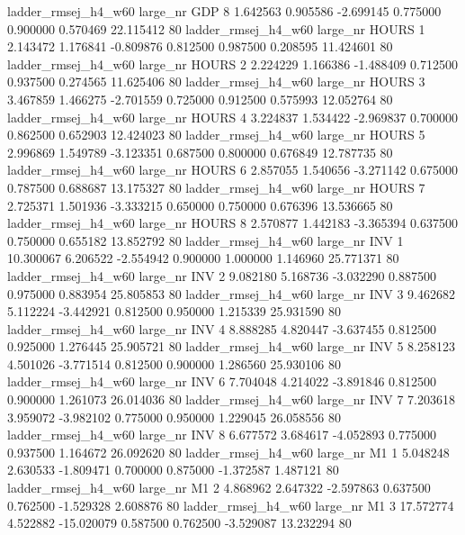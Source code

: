 ladder_rmsej_h4_w60   large_nr      GDP                 8  1.642563  0.905586  -2.699145 0.775000 0.900000  0.570469   22.115412 80
ladder_rmsej_h4_w60   large_nr    HOURS                 1  2.143472  1.176841  -0.809876 0.812500 0.987500  0.208595   11.424601 80
ladder_rmsej_h4_w60   large_nr    HOURS                 2  2.224229  1.166386  -1.488409 0.712500 0.937500  0.274565   11.625406 80
ladder_rmsej_h4_w60   large_nr    HOURS                 3  3.467859  1.466275  -2.701559 0.725000 0.912500  0.575993   12.052764 80
ladder_rmsej_h4_w60   large_nr    HOURS                 4  3.224837  1.534422  -2.969837 0.700000 0.862500  0.652903   12.424023 80
ladder_rmsej_h4_w60   large_nr    HOURS                 5  2.996869  1.549789  -3.123351 0.687500 0.800000  0.676849   12.787735 80
ladder_rmsej_h4_w60   large_nr    HOURS                 6  2.857055  1.540656  -3.271142 0.675000 0.787500  0.688687   13.175327 80
ladder_rmsej_h4_w60   large_nr    HOURS                 7  2.725371  1.501936  -3.333215 0.650000 0.750000  0.676396   13.536665 80
ladder_rmsej_h4_w60   large_nr    HOURS                 8  2.570877  1.442183  -3.365394 0.637500 0.750000  0.655182   13.852792 80
ladder_rmsej_h4_w60   large_nr      INV                 1 10.300067  6.206522  -2.554942 0.900000 1.000000  1.146960   25.771371 80
ladder_rmsej_h4_w60   large_nr      INV                 2  9.082180  5.168736  -3.032290 0.887500 0.975000  0.883954   25.805853 80
ladder_rmsej_h4_w60   large_nr      INV                 3  9.462682  5.112224  -3.442921 0.812500 0.950000  1.215339   25.931590 80
ladder_rmsej_h4_w60   large_nr      INV                 4  8.888285  4.820447  -3.637455 0.812500 0.925000  1.276445   25.905721 80
ladder_rmsej_h4_w60   large_nr      INV                 5  8.258123  4.501026  -3.771514 0.812500 0.900000  1.286560   25.930106 80
ladder_rmsej_h4_w60   large_nr      INV                 6  7.704048  4.214022  -3.891846 0.812500 0.900000  1.261073   26.014036 80
ladder_rmsej_h4_w60   large_nr      INV                 7  7.203618  3.959072  -3.982102 0.775000 0.950000  1.229045   26.058556 80
ladder_rmsej_h4_w60   large_nr      INV                 8  6.677572  3.684617  -4.052893 0.775000 0.937500  1.164672   26.092620 80
ladder_rmsej_h4_w60   large_nr       M1                 1  5.048248  2.630533  -1.809471 0.700000 0.875000 -1.372587    1.487121 80
ladder_rmsej_h4_w60   large_nr       M1                 2  4.868962  2.647322  -2.597863 0.637500 0.762500 -1.529328    2.608876 80
ladder_rmsej_h4_w60   large_nr       M1                 3 17.572774  4.522882 -15.020079 0.587500 0.762500 -3.529087   13.232294 80
